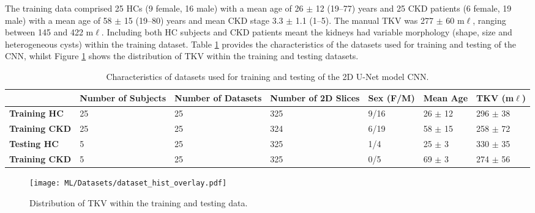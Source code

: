 The training data comprised 25 \acp{HC} (9 female, 16 male) with a mean age of 26 $\pm$ 12 (19–77) years and 25 \ac{CKD} patients (6 female, 19 male) with a mean age of 58 $\pm$ 15 (19–80) years and mean \ac{CKD} stage 3.3 $\pm$ 1.1 (1--5). The manual \ac{TKV} was 277 $\pm$ 60 m$\ell$, ranging between 145 and 422 m$\ell$. Including both \ac{HC} subjects and \ac{CKD} patients meant the kidneys had variable morphology (shape, size and heterogeneous cysts) within the training dataset. Table \ref{tab:ml_datasets} provides the characteristics of the datasets used for training and testing of the \ac{CNN}, whilst Figure \ref{fig:ml_true_tkv_hist} shows the distribution of \ac{TKV} within the training and testing datasets.
\begin{table}[H]
	\centering
	\begin{adjustbox}{width=1.0\textwidth, center}
	\begin{tabularx}{1.1\textwidth}{X|X|X|X|X|X|X}
		& \textbf{Number of Subjects} & \textbf{Number of Datasets} & \textbf{Number of 2D Slices} & \textbf{Sex (F/M)} & \textbf{Mean Age} & \textbf{TKV (m$\ell$)} \\ \hline
		\textbf{Training HC}  & 25                          & 25                          & 325                          & 9/16               & 26 $\pm$ 12       & 296 $\pm$ 38           \\
		\hline
		\textbf{Training CKD} & 25                          & 25                          & 324                          & 6/19               & 58 $\pm$ 15       & 258 $\pm$ 72           \\
		\hline
		\textbf{Testing HC}   & 5                           & 25                          & 325                          & 1/4                & 25 $\pm$ 3        & 330 $\pm$ 35           \\
		\hline
		\textbf{Training CKD} & 5                           & 25                          & 325                          & 0/5                & 69 $\pm$ 3        & 274 $\pm$ 56          
	\end{tabularx}
	\end{adjustbox}
	\caption{Characteristics of datasets used for training and testing of the 2D U-Net model \ac{CNN}.}
	\label{tab:ml_datasets}
\end{table}
\begin{figure}[H]
	\centering
	\texttt{[image: ML/Datasets/dataset\_hist\_overlay.pdf]}
	\caption{Distribution of \ac{TKV} within the training and testing data.}
	\label{fig:ml_true_tkv_hist}	
\end{figure}

